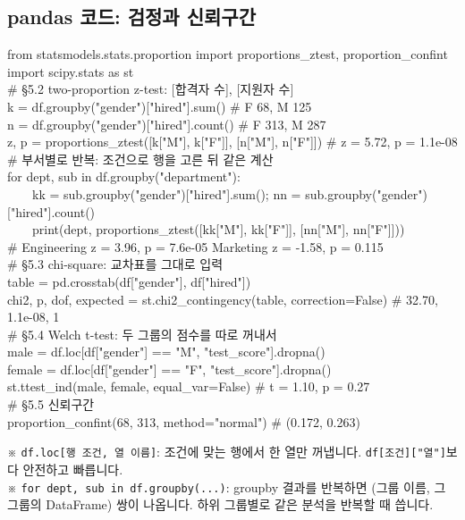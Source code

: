 \documentclass[11pt,a4paper]{article}
\newcommand{\code}[1]{\texttt{#1}}
\newcommand{\aside}[1]{{\footnotesize\color{black!65}#1}}
\begin{document}
\subsection*{pandas 코드: 검정과 신뢰구간}
\begin{codebox}
from statsmodels.stats.proportion import proportions\_ztest, proportion\_confint\\
import scipy.stats as st\\[3pt]
\# \S5.2 two-proportion z-test: [합격자 수], [지원자 수]\\
k = df.groupby("gender")["hired"].sum() \hfill \# F 68, M 125\\
n = df.groupby("gender")["hired"].count() \hfill \# F 313, M 287\\
z, p = proportions\_ztest([k["M"], k["F"]], [n["M"], n["F"]]) \hfill \# z = 5.72, p = 1.1e-08\\[3pt]
\# 부서별로 반복: 조건으로 행을 고른 뒤 같은 계산\\
for dept, sub in df.groupby("department"):\\
\ \ \ \ kk = sub.groupby("gender")["hired"].sum(); nn = sub.groupby("gender")["hired"].count()\\
\ \ \ \ print(dept, proportions\_ztest([kk["M"], kk["F"]], [nn["M"], nn["F"]]))\\
\# Engineering z = 3.96, p = 7.6e-05 \quad Marketing z = -1.58, p = 0.115\\[3pt]
\# \S5.3 chi-square: 교차표를 그대로 입력\\
table = pd.crosstab(df["gender"], df["hired"])\\
chi2, p, dof, expected = st.chi2\_contingency(table, correction=False) \hfill \# 32.70, 1.1e-08, 1\\[3pt]
\# \S5.4 Welch t-test: 두 그룹의 점수를 따로 꺼내서\\
male = df.loc[df["gender"] == "M", "test\_score"].dropna()\\
female = df.loc[df["gender"] == "F", "test\_score"].dropna()\\
st.ttest\_ind(male, female, equal\_var=False) \hfill \# t = 1.10, p = 0.27\\[3pt]
\# \S5.5 신뢰구간\\
proportion\_confint(68, 313, method="normal") \hfill \# (0.172, 0.263)
\end{codebox}
\aside{※ \code{df.loc[행 조건, 열 이름]}: 조건에 맞는 행에서 한 열만 꺼냅니다. \code{df[조건]["열"]}보다 안전하고 빠릅니다.}\\
\aside{※ \code{for dept, sub in df.groupby(...)}: groupby 결과를 반복하면 (그룹 이름, 그 그룹의 DataFrame) 쌍이 나옵니다. 하위 그룹별로 같은 분석을 반복할 때 씁니다.}
\end{document}
